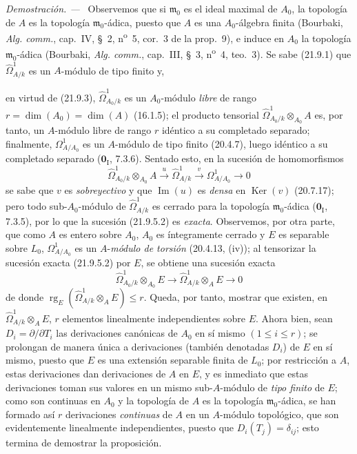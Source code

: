 \documentclass[10pt,oneside]{book}
\newcommand{\oldpage}[2][]{%
  \setcounter{footnote}{0}%
  \marginpar{\scriptsize\textbf{#1}~|~#2}\ignorespaces}
\newenvironment{proof}{%
  \par\medskip\noindent\textit{Demostración. ---\ }}{\par}
\begin{document}
\begin{proof}
Observemos que si $\mathfrak m_0$ es el ideal maximal de $A_0$, la topología
de $A$ es la topología $\mathfrak m_0$-ádica, puesto que $A$ es una
$A_0$-álgebra finita (Bourbaki, \emph{Alg. comm.}, cap.~IV, \S~2,
n\textsuperscript{o}~5, cor.~3 de la prop.~9), e induce en $A_0$ la topología
$\mathfrak m_0$-ádica (Bourbaki, \emph{Alg. comm.}, cap.~III, \S~3,
n\textsuperscript{o}~4, teo.~3). Se sabe (21.9.1) que
$\widehat\Omega^1_{A/k}$ es un $A$-módulo de tipo finito y,

\oldpage[0\textsubscript{IV-1}]{178}
en virtud de (21.9.3), $\widehat\Omega^1_{A_0/k}$ es un $A_0$-módulo \emph{libre} de
rango $r=\dim(A_0)=\dim(A)$ (16.1.5); el producto tensorial
$\widehat\Omega^1_{A_0/k}\otimes_{A_0}A$ es, por tanto, un $A$-módulo libre de
rango $r$ idéntico a su completado separado; finalmente,
$\Omega^1_{A/A_0}$ es un $A$-módulo de tipo finito (20.4.7), luego
idéntico a su completado separado ($\mathbf 0_{\mathrm I}$, 7.3.6). Sentado
esto, en la sucesión de homomorfismos
\begin{equation}
\tag{21.9.5.2}
\label{0.21.9.5.2-es}
  \widehat\Omega^1_{A_0/k}\otimes_{A_0}A
  \xrightarrow{u}\widehat\Omega^1_{A/k}
  \xrightarrow{v}\Omega^1_{A/A_0}\longrightarrow0
\end{equation}
se sabe que $v$ es \emph{sobreyectivo} y que $\operatorname{Im}(u)$ es \emph{densa} en
$\operatorname{Ker}(v)$ (20.7.17); pero todo sub-$A_0$-módulo de
$\widehat\Omega^1_{A/k}$ es cerrado para la topología $\mathfrak m_0$-ádica
($\mathbf 0_{\mathrm I}$, 7.3.5), por lo que la sucesión (21.9.5.2) es \emph{exacta}.
Observemos, por otra parte, que como $A$ es entero sobre $A_0$, $A_0$ es
íntegramente cerrado y $E$ es separable sobre $L_0$,
$\Omega^1_{A/A_0}$ es un $A$-\emph{módulo de torsión} (20.4.13, (iv)); al
tensorizar la sucesión exacta (21.9.5.2) por $E$, se obtiene una sucesión
exacta
\[
  \widehat\Omega^1_{A_0/k}\otimes_{A_0}E
  \longrightarrow \widehat\Omega^1_{A/k}\otimes_AE\longrightarrow0
\]
de donde $\operatorname{rg}_E(\widehat\Omega^1_{A/k}\otimes_AE)\leqslant r$.
Queda, por tanto, mostrar que existen, en
$\widehat\Omega^1_{A/k}\otimes_AE$, $r$ elementos linealmente independientes
sobre $E$. Ahora bien, sean $D_i=\partial/\partial T_i$ las derivaciones
canónicas de $A_0$ en sí mismo $(1\leqslant i\leqslant r)$; se prolongan de
manera única a derivaciones (también denotadas $D_i$) de $E$ en sí mismo,
puesto que $E$ es una extensión separable finita de $L_0$; por restricción a
$A$, estas derivaciones dan derivaciones de $A$ en $E$, y es inmediato que
estas derivaciones toman sus valores en un mismo sub-$A$-módulo de \emph{tipo finito}
de $E$; como son continuas en $A_0$ y la topología de $A$ es la topología
$\mathfrak m_0$-ádica, se han formado así $r$ derivaciones \emph{continuas} de $A$
en un $A$-módulo topológico, que son evidentemente linealmente independientes,
puesto que $D_i(T_j)=\delta_{ij}$; esto termina de demostrar la proposición.
\end{proof}
\end{document}
